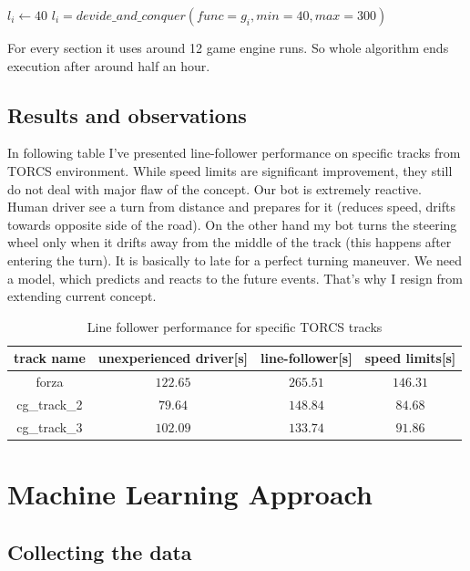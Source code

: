 \documentclass[declaration,shortabstract,english,inz]{iithesis}
\begin{document}
\begin{algorithmic}
    \STATE $l_i\gets 40$
        \STATE $l_i = devide\_and\_conquer(func=g_i, min=40, max=300)$
    \ENDFOR
\end{algorithmic}

For every section it uses around 12 game engine runs. So whole algorithm ends execution after around half an hour.

\section{Results and observations}

In following table I've presented line-follower performance on specific tracks from TORCS environment. While speed limits are significant improvement, they still do not deal with major flaw of the concept. Our bot is extremely reactive. Human driver see a turn from distance and prepares for it (reduces speed, drifts towards opposite side of the road). On the other hand my bot turns the steering wheel only when it drifts away from the middle of the track (this happens after entering the turn). It is basically to late for a perfect turning maneuver. We need a model, which predicts and reacts to the  future events. That's why I resign from extending current concept.


\begin{table}[h]
    \centering
    \begin{tabular}{ |c|c|c|c|}
          \hline
          track name & unexperienced driver[s] & line-follower[s] & speed limits[s]  \\
          \hline
          forza &  $122.65$ & $265.51$ & $146.31$   \\
          \hline
          cg\_track\_2 & $79.64$ & $148.84$ &  $84.68$  \\ 
          \hline
          cg\_track\_3 & $102.09$ & $133.74$ & $91.86$   \\
          \hline
        \end{tabular}
        \caption{Line follower performance for specific TORCS tracks}
        \label{tab:line_follower}

\end{table}

\chapter{Machine Learning Approach}

\section{Collecting the data}
\end{document}
